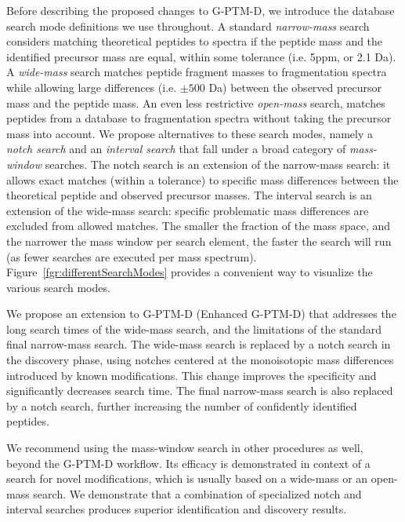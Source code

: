 \documentclass[journal=jprobs,manuscript=article]{achemso}
\begin{document}
Before describing the proposed changes to G-PTM-D, we introduce the database search mode definitions we use throughout.
A standard \textit{narrow-mass} search considers matching theoretical peptides to spectra if the peptide mass and the identified precursor mass are equal, within some tolerance (i.e. 5ppm, or 2.1 Da).
A \textit{wide-mass} search matches peptide fragment masses to fragmentation spectra while allowing large differences (i.e. $\pm 500$ Da) between the observed precursor mass and the peptide mass.
An even less restrictive \textit{open-mass} search, matches peptides from a database to  fragmentation spectra without taking the precursor mass into account.
We propose alternatives to these search modes, namely a \textit{notch search} and an \textit{interval search} that fall under a broad category of \textit{mass-window} searches.
The notch search is an extension of the narrow-mass search: it allows exact matches (within a tolerance) to specific mass differences between the theoretical peptide and observed precursor masses.
The interval search is an extension of the wide-mass search: specific problematic mass differences are excluded from allowed matches.
The smaller the fraction of the mass space, and the narrower the mass window per search element, the faster the search will run (as fewer searches are executed per mass spectrum).
Figure~\ref{fgr:differentSearchModes} provides a convenient way to visualize the various search modes.

We propose an extension to G-PTM-D (Enhanced G-PTM-D) that addresses the long search times of the wide-mass search, and the limitations of the standard final narrow-mass search.
The wide-mass search is replaced by a notch search in the discovery phase, using notches centered at the monoisotopic mass differences introduced by known modifications.
This change improves the specificity and significantly decreases search time.
The final narrow-mass search is also replaced by a notch search, further increasing the number of confidently identified peptides.

We recommend using the mass-window search in other procedures as well, beyond the G-PTM-D workflow.
Its efficacy is demonstrated in context of a search for novel modifications, which is usually based on a wide-mass or an open-mass search.
We demonstrate that a combination of specialized notch and interval searches produces superior identification and discovery results.
\end{document}

